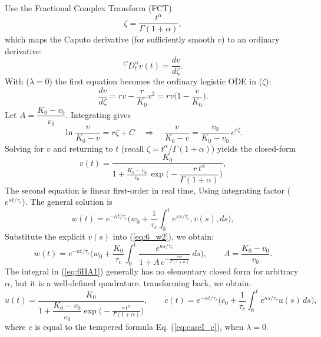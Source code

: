 \documentclass{article}
\begin{document}
\begin{description}
\begin{itemize}
Use the Fractional Complex Transform (FCT)
\begin{equation}
\zeta=\dfrac{t^\alpha}{\Gamma(1+\alpha)},
\end{equation}
which maps the Caputo derivative (for sufficiently smooth $v$) to an ordinary derivative:
\begin{equation*}
{}^{C}D_t^\alpha v(t)=\dfrac{d v}{d\zeta}.
\end{equation*}
With ($\lambda=0$) the first equation becomes the ordinary logistic ODE in ($\zeta$):
\begin{equation*}
\frac{dv}{d\zeta}=r v-\frac{r}{K_0}v^2 = r v\Big(1-\frac{v}{K_0}\Big).
\end{equation*}
Let $A=\dfrac{K_0-v_0}{v_0}$. Integrating gives
\begin{equation*}
\ln\frac{v}{K_0-v}= r\zeta + C \quad\Longrightarrow\quad
\frac{v}{K_0-v}= \frac{v_0}{K_0-v_0}\,e^{r\zeta}.
\end{equation*}
Solving for $v$ and returning to $t$ (recall $\zeta=t^\alpha/\Gamma(1+\alpha)$) yields the closed-form
\begin{equation*}
v(t)=\dfrac{K_0}{1 + \displaystyle\frac{K_0-v_0}{v_0}\,\exp\!\Big(-\dfrac{r\,t^\alpha}{\Gamma(1+\alpha)}\Big)},
\end{equation*}
The second equation is linear first-order in real time, Using integrating factor ($e^{\kappa t/\tau_c}$). The general solution is
\begin{equation}\label{eq:6_w2}
w(t)=e^{-\kappa t/\tau_c}\Bigg(w_0+\frac{1}{\tau_c}\int_0^t e^{\kappa s/\tau_c},v(s),ds\Bigg),
\end{equation}
Substitute the explicit $v(s)$ into (\ref{eq:6_w2}), we obtain:
\begin{equation}\label{eq:6IIA1}
w(t)=e^{-\kappa t/\tau_c}\Bigg(w_0+\frac{K_0}{\tau_c}\int_0^t
\frac{e^{\kappa s/\tau_c}}{1 + A\,e^{-\frac{r s^\alpha}{\Gamma(1+\alpha)}}}\,ds\Bigg),
\qquad A=\frac{K_0-v_0}{v_0}.
\end{equation}
The integral in (\ref{eq:6IIA1}) generally has no elementary closed form for arbitrary $\alpha$, but it is a well-defined quadrature. 
transforming back, we obtain:
\begin{equation}\label{eq:6_AIIU}
u(t)=\frac{K_0}{1 + \dfrac{K_0-v_0}{v_0}\exp\big(-\tfrac{r\,t^\alpha}{\Gamma(1+\alpha)}\big)},\qquad
c(t)=e^{-\kappa t/\tau_c}\Bigg(c_0+\frac{1}{\tau_c}\int_0^t e^{\kappa s/\tau_c}u(s)\,ds\Bigg),
\end{equation}
where $c$ is equal to the tempered formula Eq. (\ref{eq:caseI_c}), when $\lambda=0$.

\end{itemize}
\end{description}
\end{document}
